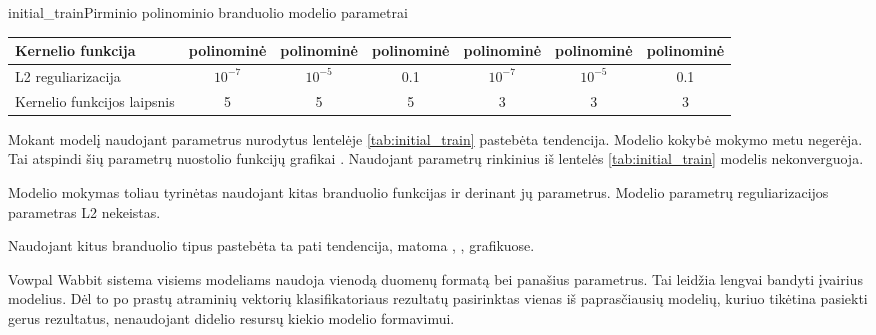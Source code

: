 \begin{ktutable}{initial_train}{Pirminio polinominio branduolio modelio parametrai}
    \begin{tabular}{| l | c | c | c | c | c | c | }
    \hline
        Kernelio funkcija & polinominė & polinominė & polinominė & polinominė & polinominė & polinominė \\ \hline
        L2 reguliarizacija & $10^{-7}$ & $10^{-5}$ & 0.1 & $10^{-7}$ & $10^{-5}$ & 0.1 \\ \hline
        Kernelio funkcijos laipsnis & 5 & 5 & 5 & 3 & 3 & 3 \\ \hline
    \end{tabular}
\end{ktutable}

Mokant modelį naudojant parametrus nurodytus lentelėje \vref{tab:initial_train} pastebėta tendencija.
Modelio kokybė mokymo metu negerėja. Tai atspindi šių parametrų nuostolio funkcijų grafikai
. Naudojant parametrų rinkinius iš lentelės \vref{tab:initial_train}
modelis nekonverguoja.


Modelio mokymas toliau tyrinėtas naudojant kitas branduolio funkcijas ir derinant jų parametrus.
Modelio parametrų reguliarizacijos parametras L2 nekeistas.


Naudojant kitus branduolio tipus pastebėta ta pati tendencija, matoma , ,  grafikuose.


Vowpal Wabbit sistema visiems modeliams naudoja vienodą duomenų formatą bei panašius parametrus.
Tai leidžia lengvai bandyti įvairius modelius. Dėl to po prastų atraminių vektorių klasifikatoriaus rezultatų
pasirinktas vienas iš paprasčiausių modelių, kuriuo tikėtina pasiekti gerus rezultatus, nenaudojant
didelio resursų kiekio modelio formavimui.

